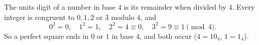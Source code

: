 The units digit of a number in base $4$ is its remainder when divided by $4$. Every integer is congruent to $0,1,2$ or $3$ modulo $4$, and
\[
0^2=0,\quad1^2=1,\quad2^2=4\equiv0,\quad3^2=9\equiv1\pmod4 .
\]
So a perfect square ends in $\boxed{0\text{ or }1}$ in base $4$, and both occur ($4=10_4$, $1=1_4$).
